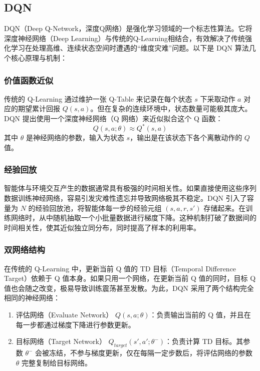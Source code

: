 \subsection{DQN}
DQN（Deep Q-Network，深度Q网络）是强化学习领域的一个标志性算法。它将深度神经网络（Deep Learning）与传统的Q-Learning相结合，有效解决了传统强化学习在处理高维、连续状态空间时遭遇的“维度灾难”问题\cite{DQN}。以下是 DQN 算法几个核心原理与机制：

\subsubsection{价值函数近似}
传统的 Q-Learning 通过维护一张 Q-Table 来记录在每个状态 $s$ 下采取动作 $a$ 对应的期望累计回报 $Q(s, a)$\cite{tai2016robot}。但在复杂的连续环境中，状态数量可能极其庞大。DQN 提出使用一个深度神经网络（Q 网络）来近似拟合这个 Q 函数：
\begin{equation}
    Q(s, a; \theta) \approx Q^*(s, a)
\end{equation}
其中 $\theta$ 是神经网络的参数，输入为状态 $s$，输出是在该状态下各个离散动作的 $Q$ 值。

\subsubsection{经验回放}
智能体与环境交互产生的数据通常具有极强的时间相关性。如果直接使用这些序列数据训练神经网络，容易引发灾难性遗忘并导致网络极其不稳定。DQN 引入了容量为 $N$ 的经验回放池，将智能体每一步的经验元组 $(s, a, r, s')$ 存储起来。在训练网络时，从中随机抽取一个小批量数据进行梯度下降。这种机制打破了数据间的时间相关性，使其近似独立同分布，同时提高了样本的利用率。

\subsubsection{双网络结构}
在传统的 Q-Learning 中，更新当前 Q 值的 TD 目标（Temporal Difference Target）依赖于 Q 值本身。如果只用一个网络，在更新当前 Q 值的同时，目标 Q 值也会随之改变，极易导致训练震荡甚至发散。为此，DQN 采用了两个结构完全相同的神经网络：
\begin{enumerate}
    \item 评估网络（Evaluate Network） $Q(s, a; \theta)$：负责输出当前的 Q 值，并且在每一步都通过梯度下降进行参数更新。
    \item 目标网络（Target Network） $Q_{target}(s', a'; \theta^-)$：负责计算 TD 目标。其参数 $\theta^-$ 会被冻结，不参与梯度更新，仅在每隔一定步数后，将评估网络的参数 $\theta$ 完整复制给目标网络。
\end{enumerate}

